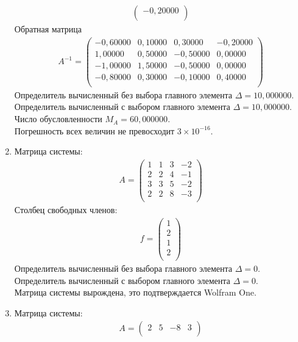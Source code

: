 \documentclass[a4paper,12pt,titlepage,finall]{article}
\begin{document}
\begin{enumerate}
\begin{align*}
\begin{pmatrix}
  -0,20000 \\
\end{pmatrix}
\end{align*}
Обратная матрица
\begin{align*}
A^{-1} = \begin{pmatrix}
-0,60000&     0,10000&     0,30000&    -0,20000 \\
   1,00000&     0,50000&    -0,50000&     0,00000 \\
  -1,00000&     1,50000&    -0,50000&     0,00000 \\
  -0,80000&     0,30000&    -0,10000&     0,40000 \\
\end{pmatrix}
\end{align*}
Определитель вычисленный без выбора главного элемента  $\Delta = 10,000000$.\\
Определитель вычисленный с выбором главного элемента $\Delta = 10,000000$.\\
Число обусловленности $M_A = 60,000000$.\\
Погрешность всех величин не превосходит $3 \times 10^{-16}$.
\item
Матрица системы:
\begin{align*}
A = \begin{pmatrix}
1&     1&     3&    -2 \\
   2&     2&     4&    -1 \\
   3&     3&     5&    -2 \\
   2&     2&     8&    -3 \\
\end{pmatrix}
\end{align*}
Столбец свободных членов:
\begin{align*}
f = \begin{pmatrix}
1 \\
2 \\
1 \\
2 \\
\end{pmatrix}
\end{align*}
Определитель вычисленный без выбора главного элемента  $\Delta = 0$.\\
Определитель вычисленный с выбором главного элемента $\Delta = 0$.\\
Матрица системы вырождена, это подтверждается Wolfram One.
\item
Матрица системы:
\begin{align*}
A = \begin{pmatrix}
2&           5&          -8&           3 \\

\end{pmatrix}
\end{align*}
\end{enumerate}
\end{document}
